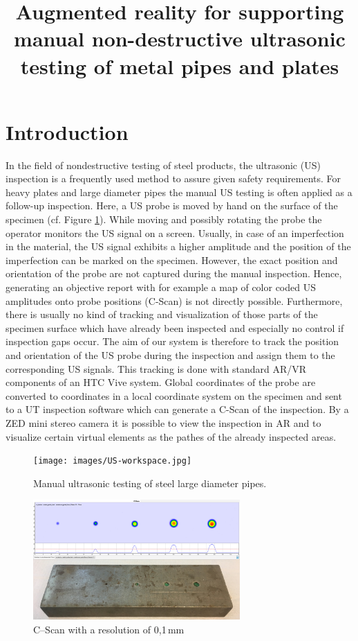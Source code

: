 \documentclass{VRARWorkshop}
\title{Augmented reality for supporting manual non-destructive ultrasonic testing of metal pipes and plates}
\begin{document}
\section{Introduction}

In the field of nondestructive testing of steel products, the ultrasonic (US) inspection is a frequently used method to assure given safety requirements. For heavy plates and large diameter pipes the manual US testing is often applied as a follow-up inspection. Here, a US probe is moved by hand on the surface of the specimen (cf. Figure \ref{fig:manual_UT}). While moving and possibly rotating the probe the operator monitors the US signal on a screen. Usually, in case of an imperfection in the material, the US signal exhibits a higher amplitude and the position of the imperfection can be marked on the specimen.
However, the exact position and orientation of the probe are not captured during the manual inspection. Hence, generating an objective report with for example a map of color coded US amplitudes onto probe positions (C-Scan) is not directly possible. Furthermore, there is usually no kind of tracking and visualization of those parts of the specimen surface which have already been inspected and especially no control if inspection gaps occur.
The aim of our system is therefore to track the position and orientation of the US probe during the inspection and assign them to the corresponding US signals. This tracking is done with standard AR/VR components of an HTC Vive system. Global coordinates of the probe are converted to coordinates in a local coordinate system on the specimen and sent to a UT inspection software which can generate a C-Scan of the inspection. By a ZED mini stereo camera it is possible to view the inspection in AR and to visualize certain virtual elements as the pathes of the already inspected areas.

\begin{figure}[h!]
    \begin{center}
        \texttt{[image: images/US-workspace.jpg]}
        \caption{\label{fig:manual_UT} Manual ultrasonic testing of steel large diameter pipes.}
    \end{center}
\end{figure}

\begin{figure}[h!]
    \begin{center}
        \includegraphics[width=79mm]{images/CScan.jpg}
        \caption{\label{fig:cScan} C--Scan with a resolution of 0,1\,mm}
    \end{center}
\end{figure}
\end{document}
